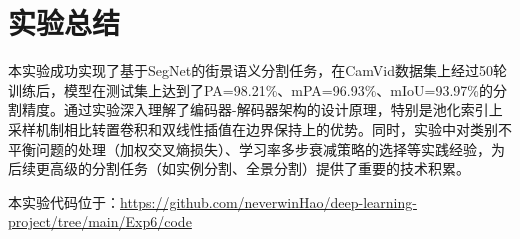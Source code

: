 \documentclass[12pt,a4paper]{article}
\begin{document}
\section{实验总结}

本实验成功实现了基于SegNet的街景语义分割任务，在CamVid数据集上经过50轮训练后，模型在测试集上达到了PA=98.21\%、mPA=96.93\%、mIoU=93.97\%的分割精度。通过实验深入理解了编码器-解码器架构的设计原理，特别是池化索引上采样机制相比转置卷积和双线性插值在边界保持上的优势。同时，实验中对类别不平衡问题的处理（加权交叉熵损失）、学习率多步衰减策略的选择等实践经验，为后续更高级的分割任务（如实例分割、全景分割）提供了重要的技术积累。

本实验代码位于：\url{https://github.com/neverwinHao/deep-learning-project/tree/main/Exp6/code}
\end{document}
